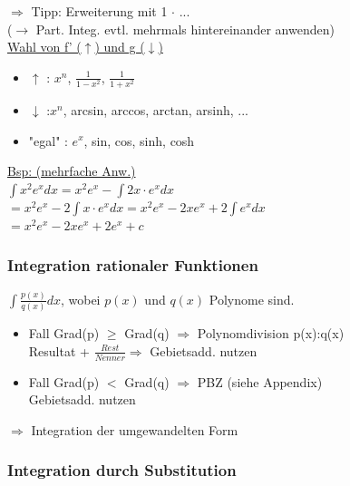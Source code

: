 \documentclass[6pt]{article}
\begin{document}
\begin{multicols*}{3}
		$\Rightarrow $ Tipp: Erweiterung mit 1 $\cdot$ ... \\
		($\rightarrow $ Part. Integ. evtl. mehrmals hintereinander anwenden) \\
		
		\underline{Wahl von f' ($\uparrow$) und g ($\downarrow$) } 
		\begin{itemize}
			\item $\uparrow$ : \quad $x^n$, $\frac{1}{1-x^2}$, $\frac{1}{1+x^2}$	
			\item $\downarrow$  :\quad $x^n$, arcsin, arccos, arctan, arsinh, ...
			\item "egal" : $e^x$, sin, cos, sinh, cosh
		\end{itemize}
		\vspace{2mm} 

		
		\underline{Bsp: (mehrfache Anw.)} \vspace{1mm} \\
		$\int x^2e^x dx = x^2e^x - \int 2x \cdot e^x  dx$ \quad  \\
		$= x^2e^x - 2 \int x \cdot e^x dx = x^2e^x - 2xe^x + 2\int e^x dx$\\
		$=x^2e^x - 2xe^x + 2e^x + c $
	
			
	
	
	\subsubsection*{Integration rationaler Funktionen}
	$\int \frac{p(x)}{q(x)} dx$, wobei $p(x)$ und $q(x)$ Polynome sind.
	
	\begin{itemize} [itemsep=2pt, parsep=3pt ]
		\item Fall Grad(p) $\geq$ Grad(q) $\Rightarrow$ Polynomdivision p(x):q(x) \\
				 Resultat + $\frac{Rest}{Nenner} \Rightarrow$ Gebietsadd. nutzen
		\item Fall Grad(p) $<$ Grad(q)  $\Rightarrow$  PBZ  (siehe Appendix)	\\
				Gebietsadd. nutzen
	\end{itemize}

	$\Rightarrow $ Integration der umgewandelten Form
	
	


	
	\subsubsection*{Integration durch Substitution}


\end{multicols*}
\end{document}
